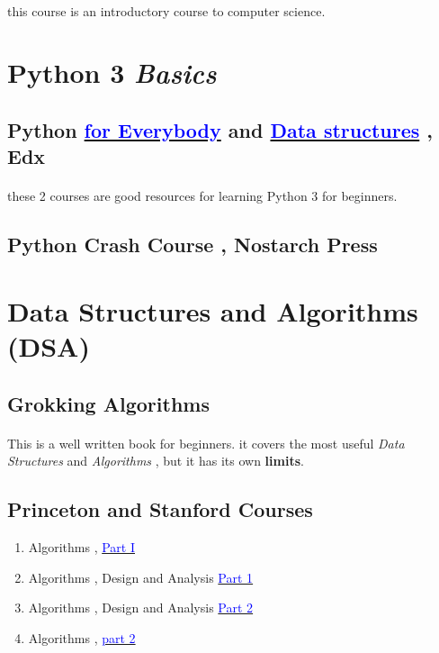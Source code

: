 \documentclass[12pt, a4paper]{article}
\begin{document}
\paragraph{}
this course is an introductory course to computer science.\\

\section{Python 3 \emph{Basics}}
\subsection*{Python \href{https://www.edx.org/course/programming-for-everybody-getting-started-with-pyt}{\textcolor{blue}{for Everybody}}
and \href{https://www.edx.org/course/python-data-structures}{\textcolor{blue}{Data structures}} , Edx}
\paragraph{}
these 2 courses are good resources for learning Python 3 for beginners.
\subsection*{Python Crash Course , Nostarch Press\\}

\section{Data Structures and Algorithms (DSA)}
\subsection*{Grokking Algorithms}
\paragraph{}
This is a well written book for beginners. it covers the most useful \emph{Data Structures} and \emph{Algorithms} , but it has its own \textbf{limits}.  

\subsection*{Princeton and Stanford Courses}

\begin{enumerate}
\item Algorithms , \href{https://www.coursera.org/learn/algorithms-part1}{\textcolor{blue}{Part I}}
\item Algorithms , Design and Analysis \href{https://www.edx.org/course/algorithms-design-and-analysis}{\textcolor{blue}{Part 1}}
\item Algorithms , Design and Analysis \href{https://www.edx.org/course/algorithms-design-and-analysis-part-2-2}{\textcolor{blue}{Part 2}}
\item Algorithms , \href{https://www.coursera.org/learn/algorithms-part2}{\textcolor{blue}{part 2}}
\end{enumerate}
\end{document}
